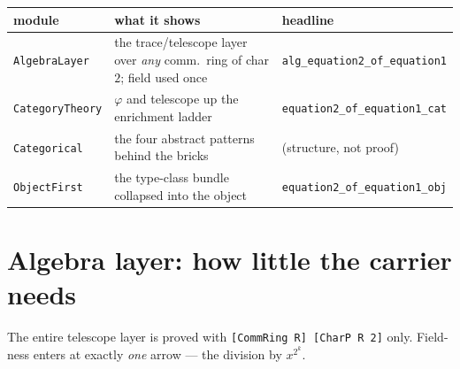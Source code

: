 \documentclass[11pt]{article}
\newcommand{\lc}[1]{\texttt{\small #1}}
\begin{document}
\begin{center}\small
\renewcommand{\arraystretch}{1.3}
\begin{tabular}{@{}p{3.0cm}p{6.1cm}p{4.9cm}@{}}
\hline
\textbf{module} & \textbf{what it shows} & \textbf{headline}\\
\hline
\lc{AlgebraLayer} & the trace/telescope layer over \emph{any} comm.\ ring of char $2$; field used once & \lc{alg\_equation2\_of\_equation1}\\
\lc{CategoryTheory} & $\varphi$ and telescope up the enrichment ladder & \lc{equation2\_of\_equation1\_cat}\\
\lc{Categorical} & the four abstract patterns behind the bricks & (structure, not proof)\\
\lc{ObjectFirst} & the type-class bundle collapsed into the object & \lc{equation2\_of\_equation1\_obj}\\
\hline
\end{tabular}
\end{center}

\section{Algebra layer: how little the carrier needs}

The entire telescope layer is proved with \lc{[CommRing R] [CharP R 2]} only.
Field-ness enters at exactly \emph{one} arrow --- the division by $x^{2^{k}}$.
\end{document}
